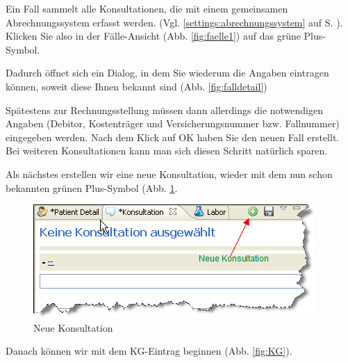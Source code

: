 Ein Fall sammelt alle Konsultationen, die mit einem gemeinsamen Abrechnungssystem erfasst werden. (Vgl. \ref{settings:abrechnungssystem} auf S. \pageref{settings:abrechnungssystem}).
Klicken Sie also in der \glqq Fälle\grqq{}-Ansicht
(Abb. \ref{fig:faelle1}) auf das grüne Plus-Symbol.

Dadurch öffnet sich ein Dialog, in dem Sie wiederum die Angaben eintragen
können, soweit diese Ihnen bekannt sind (Abb. \ref{fig:falldetail})

Spätestens zur Rechnungsstellung müssen dann allerdings die notwendigen Angaben (Debitor, Kostenträger und Versicherungsnummer bzw. Fallnummer)
eingegeben werden.
Nach dem Klick auf OK haben Sie den neuen Fall erstellt. Bei weiteren
Konsultationen kann man sich diesen Schritt natürlich sparen.\\

\bigskip

Als nächstes erstellen wir eine neue Konsultation, wieder mit dem nun schon
bekannten grünen Plus-Symbol (Abb. \ref{fig:neuekons}.

\begin{figure}[ht]
	\includegraphics{images/einf5}
	\caption{Neue Konsultation}
	\label{fig:neuekons}
\end{figure}
\pagebreak[2]

Danach können wir mit dem KG-Eintrag beginnen (Abb. \ref{fig:KG}).

